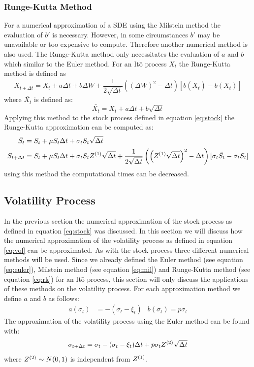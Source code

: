 \documentclass[a4paper,onecolumn]{IEEEtran}
\begin{document}
\subsubsection{Runge-Kutta Method}
For a numerical approximation of a SDE using the Milstein method the
evaluation of $b'$ is necessary. However, in some circumstances $b'$ may be
unavailable or too expensive to compute. Therefore another numerical method
is also used. The Runge-Kutta method only necessitates the evaluation of $a$
and $b$ which similar to the Euler method. For an It\=o process $X_t$ the
Runge-Kutta method is defined as
\begin{equation}\label{eq:rk}
X_{t + \Delta t} = X_t + a\Delta t + b\Delta W + \frac{1}{2\sqrt{\Delta
t}}\left(\left(\Delta W\right)^2 - \Delta
t\right)[b\left(\bar{X_t}\right)-b(X_t)]
\end{equation}
where $\bar{X_t}$ is defined as:
\begin{equation}
\bar{X_t} = X_t + a\Delta t + b \sqrt{\Delta t}
\end{equation}
Applying this method to the stock process defined in equation \eqref{eq:stock}
the Runge-Kutta approximation can be computed as:
\begin{equation}
\begin{split}
\bar{S_t} &= S_t + \mu S_t\Delta t + \sigma_t S_t \sqrt{\Delta t}\\
S_{t + \Delta t} &= S_t + \mu S_t \Delta t + \sigma_t S_t Z^{(1)}\sqrt{\Delta
t} + \frac{1}{2\sqrt{\Delta t}}\left(\left(Z^{(1)}\sqrt{\Delta t}\right)^2 -
\Delta t\right)[\sigma_t\bar{S_t} - \sigma_t S_t]
\end{split}
\end{equation}
using this method the computational times can be decreased.

\subsection{Volatility Process}
In the previous section the numerical approximation of the stock process as
defined in equation \eqref{eq:stock} was discussed. In this section we will
discuss how the numerical approximation of the volatility process as defined
in equation \eqref{eq:vol} can be approximated. As with the stock process three
different numerical methods will be used. Since we already defined the Euler
method (see equation \eqref{eq:euler}), Milstein method (see equation
\eqref{eq:mil}) and Runge-Kutta method (see equation \eqref{eq:rk}) for an
It\=o process, this section will only discuss the applications of these
methods on the volatility process. For each approximation method we define $a$
and $b$ as follows:
\begin{align}
a(\sigma_t)&= -(\sigma_t - \xi_t) & b(\sigma_t) = p\sigma_t
\end{align}
The approximation of the volatility process using the Euler method can be
found with:
\begin{equation}
\sigma_{t + \Delta t} = \sigma_t - (\sigma_t - \xi_t)\Delta t +
	p\sigma_tZ^{(2)}\sqrt{\Delta t}
\end{equation}
where $Z^{(2)}\sim N(0, 1)$ is independent from $Z^{(1)}$.
\end{document}
